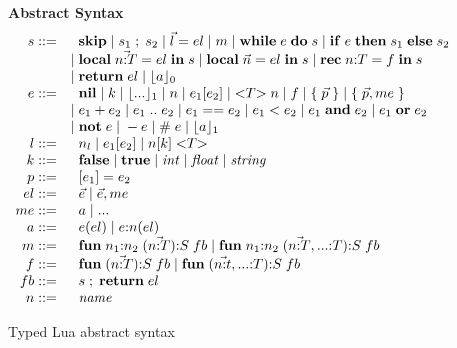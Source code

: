 \begin{figure}[!ht]
\textbf{Abstract Syntax}\\
\dstart
$$
\begin{array}{rl}
s ::= & \;\; \mathbf{skip} \; | \;
s_{1} \; ; \; s_{2} \; | \;
\vec{l} = el \; | \;
m \; | \;
\mathbf{while} \; e \; \mathbf{do} \; s \; | \;
\mathbf{if} \; e \; \mathbf{then} \; s_{1} \; \mathbf{else} \; s_{2}\\
& | \; \mathbf{local} \; \vec{n{:}T} = el \; \mathbf{in} \; s \; | \;
\mathbf{local} \; \vec{n} = el \; \mathbf{in} \; s \; | \;
\mathbf{rec} \; n{:}T = f \; \mathbf{in} \; s\\
& | \; \mathbf{return} \; el \; | \;
\lfloor a \rfloor_{0}\\
e ::= & \;\; \mathbf{nil} \; | \;
k \; | \;
\lfloor {...} \rfloor_{1} \; | \;
n \; | \;
e_{1}[e_{2}] \; | \;
{<}T{>} \; n \; | \;
f \; | \;
\{ \; \vec{p} \; \} \; | \;
\{ \; \vec{p},me \; \}\\
& | \; e_{1} + e_{2} \; | \;
e_{1} \; {..} \; e_{2} \; | \;
e_{1} == e_{2} \; | \;
e_{1} < e_{2} \; | \;
e_{1} \; \mathbf{and} \; e_{2} \; | \;
e_{1} \; \mathbf{or} \; e_{2} \\
& | \; \mathbf{not} \; e \; | \;
- e \; | \;
\# \; e \; | \;
\lfloor a \rfloor_{1}\\
l ::= & \;\; n_{l} \; | \;
e_{1}[e_{2}] \; | \;
n[k] \; {<}T{>}\\
k ::= & \;\; \mathbf{false} \; | \;
\mathbf{true} \; | \;
{\it int} \; | \;
{\it float} \; | \;
{\it string}\\
p ::= & \;\; [e_{1}] = e_{2}\\
el ::= & \;\; \vec{e} \; | \;
\vec{e}, me\\
me ::= & \;\; a \; | \;
{...}\\
a ::= & \;\; e(el) \; | \;
e{:}n(el)\\
m ::= & \;\; \mathbf{fun} \; n_{1}{:}n_{2} \; (\vec{n{:}T}){:}S \; fb \; | \;
\mathbf{fun} \; n_{1}{:}n_{2} \; (\vec{n{:}T},{...}{:}T){:}S \; fb\\
f ::= & \;\; \mathbf{fun} \; (\vec{n{:}T}){:}S \; fb \; | \;
\mathbf{fun} \; (\vec{n{:}t},{...}{:}T){:}S \; fb\\
fb ::= & \;\; s \;;\; \mathbf{return} \; el\\
n ::= & \;\; {\it name}\\
\end{array}
$$
\dend
\caption{Typed Lua abstract syntax}
\label{fig:syntax}
\end{figure}

